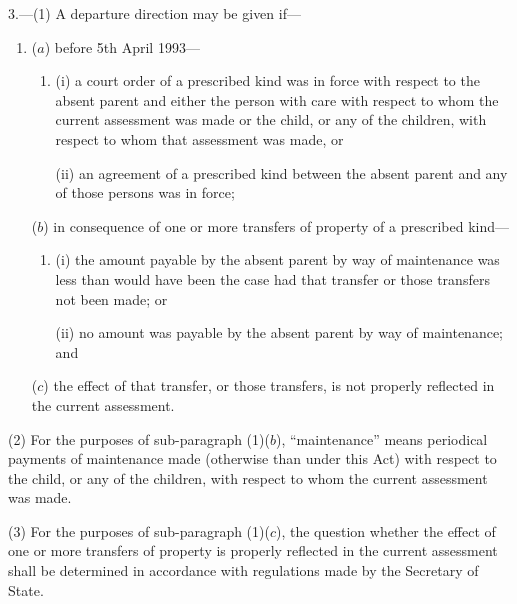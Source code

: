 \documentclass[12pt,a4paper]{article}
\begin{document}
3.---(1) A departure direction may be given if—
\begin{enumerate}\item[]
($a$) before 5th April 1993—
\begin{enumerate}\item[]
(i) a court order of a prescribed kind was in force with respect to the absent parent and either the person with care with respect to whom the current assessment was made or the child, or any of the children, with respect to whom that assessment was made, or

(ii) an agreement of a prescribed kind between the absent parent and any of those persons was in force;
\end{enumerate}

($b$) in consequence of one or more transfers of property of a prescribed kind—
\begin{enumerate}\item[]
(i) the amount payable by the absent parent by way of maintenance was less than would have been the case had that transfer or those transfers not been made; or

(ii) no amount was payable by the absent parent by way of maintenance; and
\end{enumerate}

($c$) the effect of that transfer, or those transfers, is not properly reflected in the current assessment.
\end{enumerate}

(2) For the purposes of sub-paragraph (1)($b$), “maintenance” means periodical payments of maintenance made (otherwise than under this Act) with respect to the child, or any of the children, with respect to whom the current assessment was made.

(3) For the purposes of sub-paragraph (1)($c$), the question whether the effect of one or more transfers of property is properly reflected in the current assessment shall be determined in accordance with regulations made by the Secretary of State.

\medskip
\end{document}
